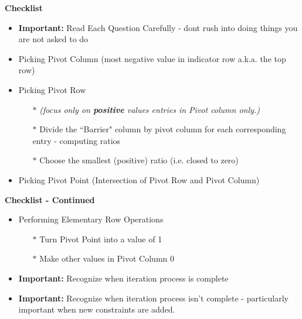 \documentclass{beamer}
\begin{document}
\begin{frame}
\vspace{-0.5cm}
	\noindent \textbf{Checklist}
	
	\begin{itemize}
        \item \textbf{Important:} Read Each Question Carefully - dont rush into doing things you are not asked to do
		\item Picking Pivot Column (most negative value in indicator row  a.k.a. the top row)
		\item Picking Pivot Row 
		
		\begin{itemize}
		
		\item[$\ast$] \textit{(focus only on \textbf{positive} values entries in Pivot column only.)} 
		\item[$\ast$]	Divide the ``Barrier" column by pivot column for each corresponding
			entry - computing ratios
			\item[$\ast$] Choose the smallest (positive) ratio (i.e. closed to zero)
		\end{itemize}
		\item Picking Pivot Point (Intersection of Pivot Row and Pivot Column)
	\end{itemize}
	
\end{frame}
\begin{frame}
	\vspace{-0.5cm}
	\noindent \textbf{Checklist - Continued}
	
	\begin{itemize}
		\item Performing Elementary Row Operations 
			\begin{itemize}
				\item[$\ast$] Turn Pivot Point into a value of 1
				\item[$\ast$] Make other values in Pivot Column 0
			\end{itemize}
		\item \textbf{Important:} Recognize when iteration process is complete 
		\item \textbf{Important:} Recognize when iteration process isn't complete - particularly important when new constraints are added.

	\end{itemize}
	
\end{frame}
\end{document}

